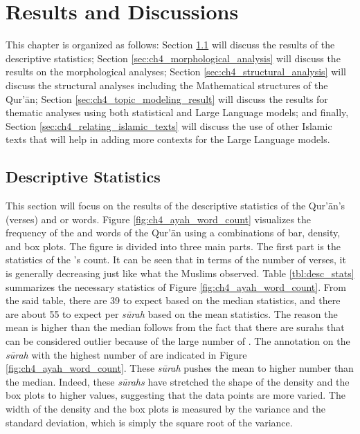 \chapter{Results and Discussions}
This chapter is organized as follows: Section \ref{sec:ch4_desc_stat} will discuss the results of the descriptive statistics; Section \ref{sec:ch4_morphological_analysis} will discuss the results on the morphological analyses; Section \ref{sec:ch4_structural_analysis} will discuss the structural analyses including the Mathematical structures of the Qur'\=an; Section \ref{sec:ch4_topic_modeling_result} will discuss the results for thematic analyses using both statistical and Large Language models; and finally, 
Section \ref{sec:ch4_relating_islamic_texts} will discuss the use of other Islamic texts that will help in adding more contexts for the Large Language models.
\section{Descriptive Statistics}\label{sec:ch4_desc_stat}
This section will focus on the results of the descriptive statistics of the Qur'\=an's   (verses) and   or words. Figure \ref{fig:ch4_ayah_word_count} visualizes the frequency of the   and words of the Qur'\=an using a combinations of bar, density, and box plots. The figure is divided into three main parts. The first part is the statistics of the 's  count. It can be seen that in terms of the number of verses, it is generally decreasing just like what the Muslims observed. Table \ref{tbl:desc_stats} summarizes the necessary statistics of Figure \ref{fig:ch4_ayah_word_count}. From the said table, there are 39   to expect based on the median statistics, and there are about 55   to expect per \textit{s\=urah}  based on the mean statistics. The reason the mean is higher than the median follows from the fact that there are surahs that can be considered outlier because of the large number of  . The annotation on the \textit{s\=urah}  with the highest number of   are indicated in Figure \ref{fig:ch4_ayah_word_count}. These \textit{s\=urah}  pushes the mean to higher number than the median. Indeed, these \textit{s\=urahs}  have stretched the shape of the density and the box plots to higher values, suggesting that the data points are more varied. The width of the density and the box plots is measured by the variance and the standard deviation, which is simply the square root of the variance. 

